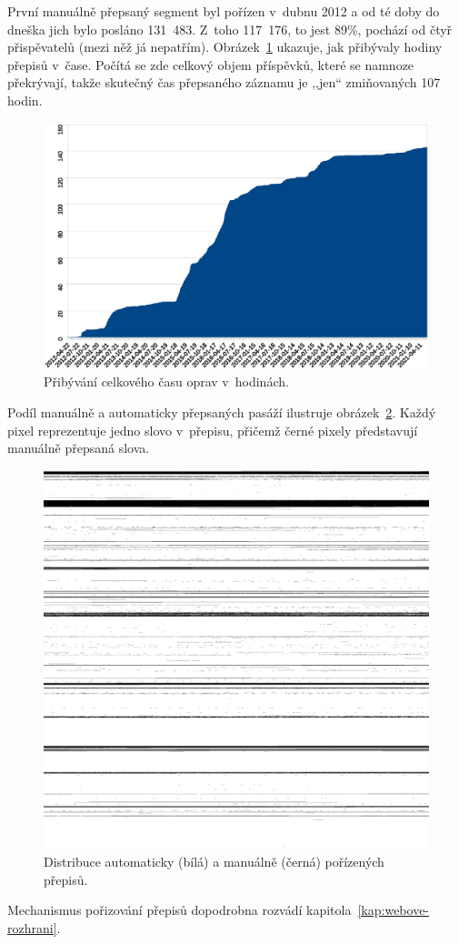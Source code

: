 První manuálně přepsaný segment byl pořízen v~dubnu 2012 a od té doby do dneška
jich bylo posláno 131~483. Z~toho 117~176, to jest 89\%, pochází od čtyř
přispěvatelů (mezi něž já nepatřím).
Obrázek~\ref{fig:corpus-growth} ukazuje, jak přibývaly hodiny přepisů v~čase.
Počítá se zde celkový objem příspěvků, které se namnoze překrývají, takže
skutečný čas přepsaného záznamu je ,,jen`` zmiňovaných 107 hodin.

\begin{figure}[htpb]
\includegraphics[scale=0.63]{rc/corpus-growth.eps}
\caption{Přibývání celkového času oprav v~hodinách.}
\label{fig:corpus-growth}
\end{figure}

Podíl manuálně a automaticky přepsaných pasáží ilustruje
obrázek~\ref{fig:humbits}. Každý pixel reprezentuje jedno slovo v~přepisu,
přičemž černé pixely představují manuálně přepsaná slova.

\begin{figure}[htpb]
\includegraphics[scale=0.137]{rc/humbits.png}
\caption{Distribuce automaticky (bílá) a manuálně (černá) pořízených přepisů.}
\label{fig:humbits}
\end{figure}

Mechanismus pořizování přepisů dopodrobna rozvádí kapitola~\ref{kap:webove-rozhrani}. 
